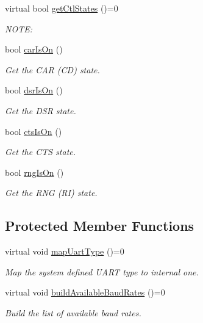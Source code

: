 \begin{DoxyCompactItemize}
virtual bool \hyperlink{classmdt_abstract_serial_port_aaeacd26b220ab0f8c521cef74edfafdd}{getCtlStates} ()=0
\begin{DoxyCompactList}\small\item\em NOTE: \end{DoxyCompactList}\item 
bool \hyperlink{classmdt_abstract_serial_port_abf0be424c1a8cf01b830cc6b371e8695}{carIsOn} ()
\begin{DoxyCompactList}\small\item\em Get the CAR (CD) state. \end{DoxyCompactList}\item 
bool \hyperlink{classmdt_abstract_serial_port_a76816aa53a6dce0ab30b9f1d095dd045}{dsrIsOn} ()
\begin{DoxyCompactList}\small\item\em Get the DSR state. \end{DoxyCompactList}\item 
bool \hyperlink{classmdt_abstract_serial_port_a9bea314eefd6f4ec79456bc21e6c66af}{ctsIsOn} ()
\begin{DoxyCompactList}\small\item\em Get the CTS state. \end{DoxyCompactList}\item 
bool \hyperlink{classmdt_abstract_serial_port_a0a3954438d1e8180e53717cc0fe1ce3e}{rngIsOn} ()
\begin{DoxyCompactList}\small\item\em Get the RNG (RI) state. \end{DoxyCompactList}\end{DoxyCompactItemize}
\subsection*{Protected Member Functions}
\begin{DoxyCompactItemize}
\item 
virtual void \hyperlink{classmdt_abstract_serial_port_abbc98ff6721f120d68b43078e90b1195}{mapUartType} ()=0
\begin{DoxyCompactList}\small\item\em Map the system defined UART type to internal one. \end{DoxyCompactList}\item 
virtual void \hyperlink{classmdt_abstract_serial_port_a6241c9f53d60fd477e2375bd5b36073f}{buildAvailableBaudRates} ()=0
\begin{DoxyCompactList}\small\item\em Build the list of available baud rates. \end{DoxyCompactList}\end{DoxyCompactItemize}
